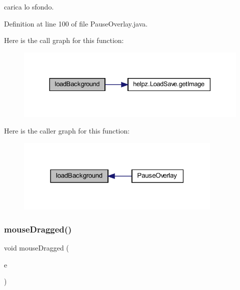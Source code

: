 carica lo sfondo. 



Definition at line 100 of file Pause\+Overlay.\+java.

Here is the call graph for this function\+:\nopagebreak
\begin{figure}[H]
\begin{center}
\leavevmode
\includegraphics[width=330pt]{classui_1_1_pause_overlay_ab9e42b0ec1e9c9ffdf1edd5dec1b0ddd_cgraph}
\end{center}
\end{figure}
Here is the caller graph for this function\+:\nopagebreak
\begin{figure}[H]
\begin{center}
\leavevmode
\includegraphics[width=279pt]{classui_1_1_pause_overlay_ab9e42b0ec1e9c9ffdf1edd5dec1b0ddd_icgraph}
\end{center}
\end{figure}
\mbox{\label{classui_1_1_pause_overlay_adbfc0588c017133c9b7070474402b72f}} 
\subsubsection{\texorpdfstring{mouse\+Dragged()}{mouseDragged()}}
{\footnotesize\ttfamily void mouse\+Dragged (\begin{DoxyParamCaption}\item[{Mouse\+Event}]{e }\end{DoxyParamCaption})}



